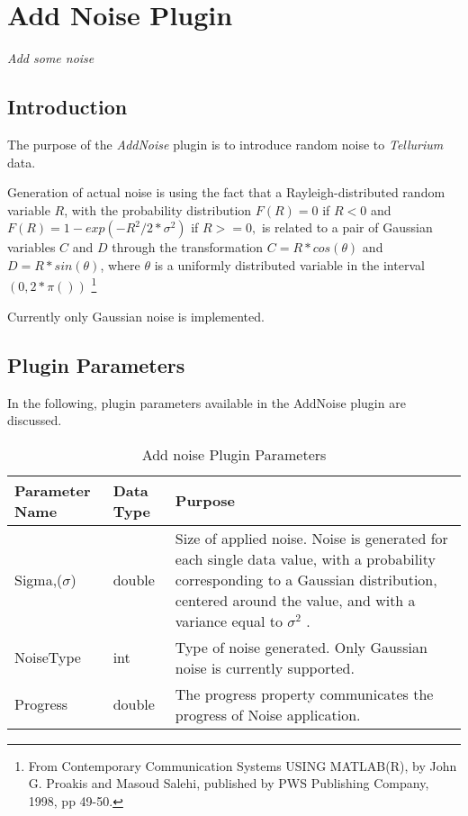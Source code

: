 \chapter*{Add Noise Plugin}
\setcounter{chapter}{1}
\emph{Add some noise}
\section{Introduction}
The purpose of the \emph{AddNoise} plugin is to introduce random noise to \emph{Tellurium} data. 

Generation of actual noise is using the fact that a Rayleigh-distributed random variable $R$, with
the probability distribution $F(R) = 0$ if $R < 0$ and $F(R) = 1 - exp(-R^2/2*\sigma^2)$ if $R >= 0, $
is related to a pair of Gaussian variables $C$ and $D$ through the transformation $C = R * cos(\theta)$ and
$D = R * sin(\theta)$, where $\theta$ is a uniformly distributed variable
in the interval $(0, 2*\pi())$ \footnote{From Contemporary Communication Systems
USING MATLAB(R), by John G. Proakis and Masoud Salehi, published by
PWS Publishing Company, 1998, pp 49-50.} 

Currently only Gaussian noise is implemented. 

 
\section{Plugin Parameters}
In the following, plugin parameters available in the AddNoise plugin are discussed.

\begin{table}[ht]
\centering %
\begin{tabular}{l l p{7.5cm}} %

Parameter Name & Data Type & Purpose \\ [0.5ex] %
\hline %
Sigma,($\sigma$)         	& 	double & Size of applied noise. Noise is generated for each single data value, with a probability corresponding to a Gaussian distribution, centered around the value, and with a variance equal to $\sigma^2$ .\\
NoiseType      	& 	int    & Type of noise generated. Only Gaussian noise is currently supported. \\
Progress     	& 	double  & The progress property communicates the progress of Noise application. \\

\hline %
\end{tabular}
\caption{Add noise Plugin Parameters} 
\label{table:AddNoisePluginParameters} 
\end{table}


